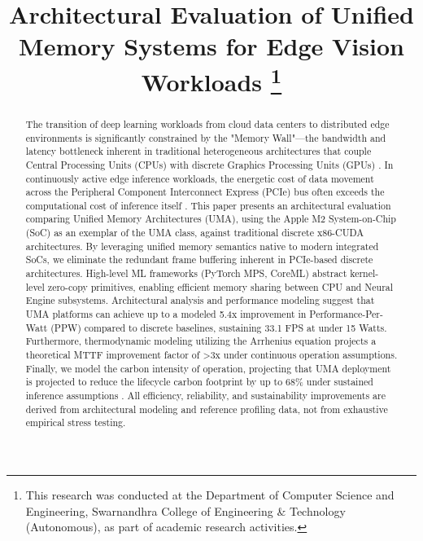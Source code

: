 \documentclass[conference]{IEEEtran}
\begin{document}
\title{Architectural Evaluation of Unified Memory Systems for Edge Vision Workloads
\thanks{This research was conducted at the Department of Computer Science and Engineering, Swarnandhra College of Engineering \& Technology (Autonomous), as part of academic research activities.}
}

\author{
}

\maketitle

\begin{abstract}
The transition of deep learning workloads from cloud data centers to distributed edge environments is significantly constrained by the "Memory Wall"—the bandwidth and latency bottleneck inherent in traditional heterogeneous architectures that couple Central Processing Units (CPUs) with discrete Graphics Processing Units (GPUs) \cite{b2}. In continuously active edge inference workloads, the energetic cost of data movement across the Peripheral Component Interconnect Express (PCIe) bus often exceeds the computational cost of inference itself \cite{b8}. This paper presents an architectural evaluation comparing Unified Memory Architectures (UMA), using the Apple M2 System-on-Chip (SoC) as an exemplar of the UMA class, against traditional discrete x86-CUDA architectures. By leveraging unified memory semantics native to modern integrated SoCs, we eliminate the redundant frame buffering inherent in PCIe-based discrete architectures. High-level ML frameworks (PyTorch MPS, CoreML) abstract kernel-level zero-copy primitives, enabling efficient memory sharing between CPU and Neural Engine subsystems. Architectural analysis and performance modeling suggest that UMA platforms can achieve up to a modeled 5.4x improvement in Performance-Per-Watt (PPW) compared to discrete baselines, sustaining 33.1 FPS at under 15 Watts. Furthermore, thermodynamic modeling utilizing the Arrhenius equation projects a theoretical MTTF improvement factor of >3x under continuous operation assumptions. Finally, we model the carbon intensity of operation, projecting that UMA deployment is projected to reduce the lifecycle carbon footprint by up to 68\% under sustained inference assumptions \cite{b12}. All efficiency, reliability, and sustainability improvements are derived from architectural modeling and reference profiling data, not from exhaustive empirical stress testing.
\end{abstract}
\end{document}
